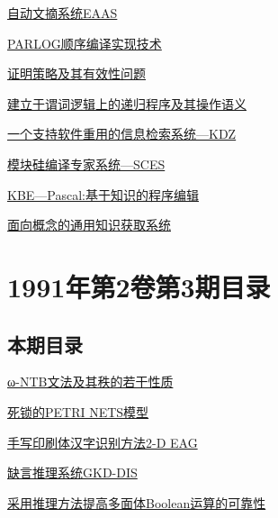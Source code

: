 \documentclass[a4paper]{article}
\begin{document}
\href{http://www.jos.org.cn/ch/reader/download_pdf.aspx?file_no=19910402&year_id=1991&quarter_id=4&falg=1}{自动文摘系统EAAS}

\href{http://www.jos.org.cn/ch/reader/download_pdf.aspx?file_no=19910403&year_id=1991&quarter_id=4&falg=1}{PARLOG顺序编译实现技术}

\href{http://www.jos.org.cn/ch/reader/download_pdf.aspx?file_no=19910404&year_id=1991&quarter_id=4&falg=1}{证明策略及其有效性问题}

\href{http://www.jos.org.cn/ch/reader/download_pdf.aspx?file_no=19910405&year_id=1991&quarter_id=4&falg=1}{建立于谓词逻辑上的递归程序及其操作语义}

\href{http://www.jos.org.cn/ch/reader/download_pdf.aspx?file_no=19910406&year_id=1991&quarter_id=4&falg=1}{一个支持软件重用的信息检索系统—KDZ}

\href{http://www.jos.org.cn/ch/reader/download_pdf.aspx?file_no=19910407&year_id=1991&quarter_id=4&falg=1}{模块硅编译专家系统—SCES}

\href{http://www.jos.org.cn/ch/reader/download_pdf.aspx?file_no=19910408&year_id=1991&quarter_id=4&falg=1}{KBE—Pascal:基于知识的程序编辑}

\href{http://www.jos.org.cn/ch/reader/download_pdf.aspx?file_no=19910409&year_id=1991&quarter_id=4&falg=1}{面向概念的通用知识获取系统}


\section{\textbf{1991年第2卷第3期目录}}
\subsection{本期目录}
\href{http://www.jos.org.cn/ch/reader/download_pdf.aspx?file_no=19910301&year_id=1991&quarter_id=3&falg=1}{ω-NTB文法及其秩的若干性质}

\href{http://www.jos.org.cn/ch/reader/download_pdf.aspx?file_no=19910302&year_id=1991&quarter_id=3&falg=1}{死锁的PETRI NETS模型}

\href{http://www.jos.org.cn/ch/reader/download_pdf.aspx?file_no=19910303&year_id=1991&quarter_id=3&falg=1}{手写印刷体汉字识别方法2-D EAG}

\href{http://www.jos.org.cn/ch/reader/download_pdf.aspx?file_no=19910304&year_id=1991&quarter_id=3&falg=1}{缺言推理系统GKD-DIS}

\href{http://www.jos.org.cn/ch/reader/download_pdf.aspx?file_no=19910305&year_id=1991&quarter_id=3&falg=1}{采用推理方法提高多面体Boolean运算的可靠性}
\end{document}
